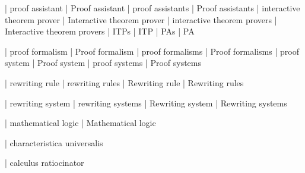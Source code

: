 




 | proof assistant
 | Proof assistant
 | proof assistants
 | Proof assistants
 | interactive theorem prover
 | Interactive theorem prover
 | interactive theorem provers
 | Interactive theorem provers
 | ITPs
 | ITP
 | PAs
 | PA

 | proof formalism
 | Proof formalism
 | proof formalisms
 | Proof formalisms
 | proof system
 | Proof system
 | proof systems
 | Proof systems

 | rewriting rule
 | rewriting rules
 | Rewriting rule
 | Rewriting rules

 | rewriting system
 | rewriting systems
 | Rewriting system
 | Rewriting systems

 | mathematical logic
 | Mathematical logic

 | characteristica universalis

 | calculus ratiocinator
 
